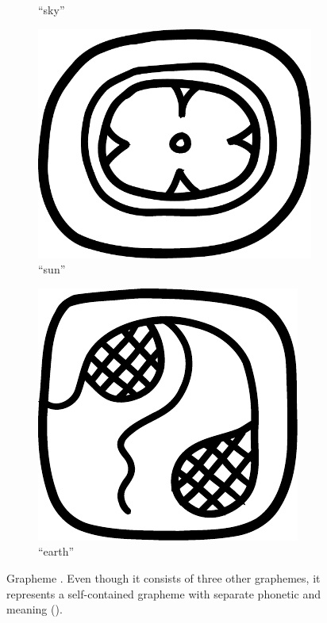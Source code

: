 \documentclass[../main.tex]{subfiles}
\begin{document}
\begin{figure}
\begin{subfigure}[b]{0.24\textwidth}
        \caption{ ``sky''}
        \label{fig:terminology-glyphs-chan}
    \end{subfigure}
    \begin{subfigure}[b]{0.24\textwidth}
        \centering
        \includegraphics[height=\glyphblockheight]{img/grapheme-KIN}
        \caption{ ``sun''}
        \label{fig:terminology-glyphs-kin}
    \end{subfigure}
    \begin{subfigure}[b]{0.24\textwidth}
        \centering
        \includegraphics[height=\glyphblockheight]{img/grapheme-KAB}
        \caption{ ``earth''}
        \label{fig:terminology-glyphs-kab}
    \end{subfigure}
    \caption{Grapheme . Even though it consists of three other graphemes, 
             it represents a self-contained grapheme with separate phonetic and meaning 
             (\cite[139]{prager2018}).}
\end{figure}
\end{document}
